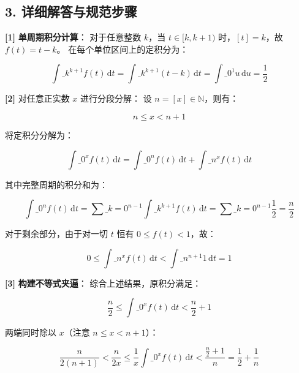 \documentclass[11pt,a4paper,UTF8]{ctexart}
\begin{document}
\subsection{3. 详细解答与规范步骤}
\begin{solbox}[分步推导与答题规范]
\textbf{[1]}  \textbf{单周期积分计算}：
对于任意整数 $k$，当 $t \in [k, k+1)$ 时，$[t] = k$，故 $f(t) = t - k$。
在每个单位区间上的定积分为：

\begin{equation*}
\int\_k^{k+1} f(t)\,\mathrm{d}t = \int\_k^{k+1} (t-k)\,\mathrm{d}t = \int\_0^1 u\,\mathrm{d}u = \frac{1}{2}
\end{equation*}


\textbf{[2]}  \textit{}对任意正实数 $x$ 进行分段分解\textit{}：
设 $n = [x] \in \mathbb{N}$，则有：

\begin{equation*}
n \le x < n+1
\end{equation*}

将定积分分解为：

\begin{equation*}
\int\_0^x f(t)\,\mathrm{d}t = \int\_0^n f(t)\,\mathrm{d}t + \int\_n^x f(t)\,\mathrm{d}t
\end{equation*}

其中完整周期的积分和为：

\begin{equation*}
\int\_0^n f(t)\,\mathrm{d}t = \sum\_{k=0}^{n-1} \int\_k^{k+1} f(t)\,\mathrm{d}t = \sum\_{k=0}^{n-1} \frac{1}{2} = \frac{n}{2}
\end{equation*}

对于剩余部分，由于对一切 $t$ 恒有 $0 \le f(t) < 1$，故：

\begin{equation*}
0 \le \int\_n^x f(t)\,\mathrm{d}t < \int\_n^{n+1} 1\,\mathrm{d}t = 1
\end{equation*}


\textbf{[3]}  \textbf{构建不等式夹逼}：
综合上述结果，原积分满足：

\begin{equation*}
\frac{n}{2} \le \int\_0^x f(t)\,\mathrm{d}t < \frac{n}{2} + 1
\end{equation*}

两端同时除以 $x$（注意 $n \le x < n+1$）：

\begin{equation*}
\frac{n}{2(n+1)} < \frac{n}{2x} \le \frac{1}{x}\int\_0^x f(t)\,\mathrm{d}t < \frac{\frac{n}{2} + 1}{n} = \frac{1}{2} + \frac{1}{n}
\end{equation*}


\end{solbox}
\end{document}
